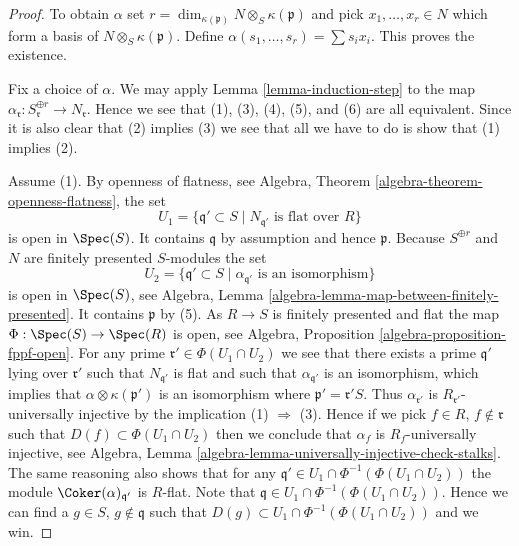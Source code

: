 \begin{proof}
To obtain $\alpha$ set
$r = \dim_{\kappa(\mathfrak p)} N \otimes_S \kappa(\mathfrak p)$ and pick
$x_1, \ldots, x_r \in N$ which form a basis of
$N \otimes_S \kappa(\mathfrak p)$. Define
$\alpha(s_1, \ldots, s_r) = \sum s_i x_i$. This proves the existence.

\medskip\noindent
Fix a choice of $\alpha$.
We may apply
Lemma \ref{lemma-induction-step}
to the map
$\alpha_{\mathfrak r} : S_{\mathfrak r}^{\oplus r} \to N_{\mathfrak r}$.
Hence we see that (1), (3), (4), (5), and (6) are all equivalent.
Since it is also clear that (2) implies (3) we see that all we have to
do is show that (1) implies (2).

\medskip\noindent
Assume (1). By openness of flatness, see
Algebra, Theorem \ref{algebra-theorem-openness-flatness},
the set
$$
U_1 = \{\mathfrak q' \subset S \mid N_{\mathfrak q'}\text{ is flat over }R\}
$$
is open in $\Spec(S)$. It contains $\mathfrak q$ by assumption
and hence $\mathfrak p$. Because $S^{\oplus r}$ and $N$ are finitely presented
$S$-modules the set
$$
U_2 = \{\mathfrak q' \subset S \mid
\alpha_{\mathfrak q'}\text{ is an isomorphism}\}
$$
is open in $\Spec(S)$, see
Algebra, Lemma \ref{algebra-lemma-map-between-finitely-presented}.
It contains $\mathfrak p$ by (5). As $R \to S$
is finitely presented and flat the map
$\Phi : \Spec(S) \to \Spec(R)$ is open, see
Algebra, Proposition \ref{algebra-proposition-fppf-open}.
For any prime $\mathfrak r' \in \Phi(U_1 \cap U_2)$ we see that
there exists a prime $\mathfrak q'$ lying over $\mathfrak r'$ such that
$N_{\mathfrak q'}$ is flat and such that $\alpha_{\mathfrak q'}$ is
an isomorphism, which implies that $\alpha \otimes \kappa(\mathfrak p')$
is an isomorphism where $\mathfrak p' = \mathfrak r' S$. Thus
$\alpha_{\mathfrak r'}$ is $R_{\mathfrak r'}$-universally injective
by the implication (1) $\Rightarrow$ (3).
Hence if we pick $f \in R$, $f \not \in \mathfrak r$ such that
$D(f) \subset \Phi(U_1 \cap U_2)$ then we conclude that
$\alpha_f$ is $R_f$-universally injective, see
Algebra, Lemma \ref{algebra-lemma-universally-injective-check-stalks}.
The same reasoning also shows that for any
$\mathfrak q' \in U_1 \cap \Phi^{-1}(\Phi(U_1 \cap U_2))$
the module $\Coker(\alpha)_{\mathfrak q'}$ is $R$-flat.
Note that $\mathfrak q \in U_1 \cap \Phi^{-1}(\Phi(U_1 \cap U_2))$.
Hence we can find a $g \in S$, $g \not \in \mathfrak q$ such
that $D(g) \subset U_1 \cap \Phi^{-1}(\Phi(U_1 \cap U_2))$
and we win.
\end{proof}

